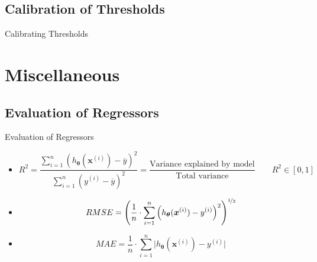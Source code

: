 \subsection{Calibration of Thresholds}

\begin{frame}{Calibrating Thresholds}{}
\end{frame}


\section{Miscellaneous}

\subsection{Evaluation of Regressors}

\begin{frame}{Evaluation of Regressors}{}
	\begin{itemize}
		\item {}
		\scriptsize
		\begin{equation}
			R^2 	= \frac{\sum_{i=1}^n (h_{\bm{\theta}}(\bm{x}^{(i)}) - \overline{y})^2}{\sum_{i=1}^n (y^{(i)} - \overline{y})^2}
					= \frac{\text{Variance explained by model}}{\text{Total variance}} \qquad R^2 \in [0,1]
		\end{equation}
		\normalsize
		\item {}
		\scriptsize
		\begin{equation}
			RMSE = \left( \frac{1}{n} \cdot \sum_{i=1}^n \left( h_{\bm{\theta}}(\bm{x}^{(i)}) - y^{(i)} \right)^2 \right)^{\nicefrac{1}{2}}
		\end{equation}
		\normalsize
		\item {}
		\scriptsize
		\begin{equation}
			MAE = \frac{1}{n} \cdot \sum_{i=1}^n \vert h_{\bm{\theta}}(\bm{x}^{(i)}) - y^{(i)} \vert
		\end{equation}
	\end{itemize}
\end{frame}


